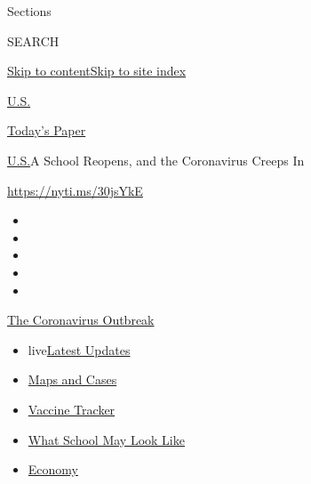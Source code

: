 Sections

SEARCH

\protect\hyperlink{site-content}{Skip to
content}\protect\hyperlink{site-index}{Skip to site index}

\href{https://www.nytimes3xbfgragh.onion/section/us}{U.S.}

\href{https://myaccount.nytimes3xbfgragh.onion/auth/login?response_type=cookie\&client_id=vi}{}

\href{https://www.nytimes3xbfgragh.onion/section/todayspaper}{Today's
Paper}

\href{/section/us}{U.S.}\textbar{}A School Reopens, and the Coronavirus
Creeps In

\url{https://nyti.ms/30jsYkE}

\begin{itemize}
\item
\item
\item
\item
\item
\end{itemize}

\href{https://www.nytimes3xbfgragh.onion/news-event/coronavirus?action=click\&pgtype=Article\&state=default\&region=TOP_BANNER\&context=storylines_menu}{The
Coronavirus Outbreak}

\begin{itemize}
\tightlist
\item
  live\href{https://www.nytimes3xbfgragh.onion/2020/08/01/world/coronavirus-covid-19.html?action=click\&pgtype=Article\&state=default\&region=TOP_BANNER\&context=storylines_menu}{Latest
  Updates}
\item
  \href{https://www.nytimes3xbfgragh.onion/interactive/2020/us/coronavirus-us-cases.html?action=click\&pgtype=Article\&state=default\&region=TOP_BANNER\&context=storylines_menu}{Maps
  and Cases}
\item
  \href{https://www.nytimes3xbfgragh.onion/interactive/2020/science/coronavirus-vaccine-tracker.html?action=click\&pgtype=Article\&state=default\&region=TOP_BANNER\&context=storylines_menu}{Vaccine
  Tracker}
\item
  \href{https://www.nytimes3xbfgragh.onion/interactive/2020/07/29/us/schools-reopening-coronavirus.html?action=click\&pgtype=Article\&state=default\&region=TOP_BANNER\&context=storylines_menu}{What
  School May Look Like}
\item
  \href{https://www.nytimes3xbfgragh.onion/live/2020/07/31/business/stock-market-today-coronavirus?action=click\&pgtype=Article\&state=default\&region=TOP_BANNER\&context=storylines_menu}{Economy}
\end{itemize}

